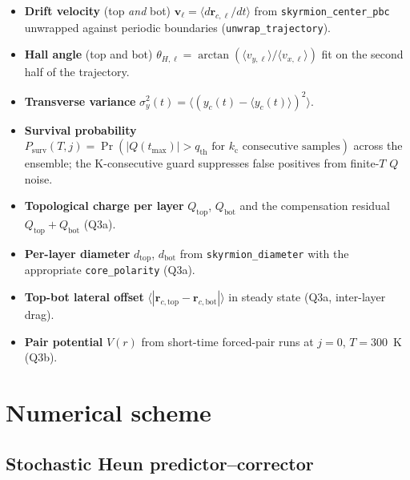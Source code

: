 \documentclass[11pt,a4paper]{article}
\newcommand{\mb}[1]{\mathbf{#1}}
\newcommand{\jcur}{j}
\begin{document}
\begin{itemize}[leftmargin=2em]
    \item \textbf{Drift velocity} (top \emph{and} bot)
    $\mb{v}_\ell = \langle d\mb{r}_{c,\ell} / dt \rangle$ from
    \texttt{skyrmion\_center\_pbc} unwrapped against periodic
    boundaries (\texttt{unwrap\_trajectory}).
    \item \textbf{Hall angle} (top and bot)
    $\theta_{H,\ell} = \arctan(\langle v_{y,\ell}\rangle / \langle v_{x,\ell}\rangle)$
    fit on the second half of the trajectory.
    \item \textbf{Transverse variance}
    $\sigma_y^2(t) = \langle (y_c(t) - \langle y_c(t)\rangle)^2 \rangle$.
    \item \textbf{Survival probability}
    $P_{\text{surv}}(T, \jcur) = \Pr(|Q(t_{\max})| > q_{\text{th}}
    \text{ for } k_{\text{c}} \text{ consecutive samples})$
    across the ensemble; the K-consecutive guard suppresses false
    positives from finite-$T$ $Q$ noise.
    \item \textbf{Topological charge per layer} $Q_{\text{top}}$,
    $Q_{\text{bot}}$ and the compensation residual
    $Q_{\text{top}} + Q_{\text{bot}}$ (Q3a).
    \item \textbf{Per-layer diameter} $d_{\text{top}}$,
    $d_{\text{bot}}$ from \texttt{skyrmion\_diameter} with the
    appropriate \texttt{core\_polarity} (Q3a).
    \item \textbf{Top-bot lateral offset}
    $\langle |\mb{r}_{c,\text{top}} - \mb{r}_{c,\text{bot}}| \rangle$
    in steady state (Q3a, inter-layer drag).
    \item \textbf{Pair potential} $V(r)$ from short-time forced-pair
    runs at $\jcur = 0$, $T = 300$~K (Q3b).
\end{itemize}

\section{Numerical scheme}

\subsection{Stochastic Heun predictor--corrector}
\end{document}
